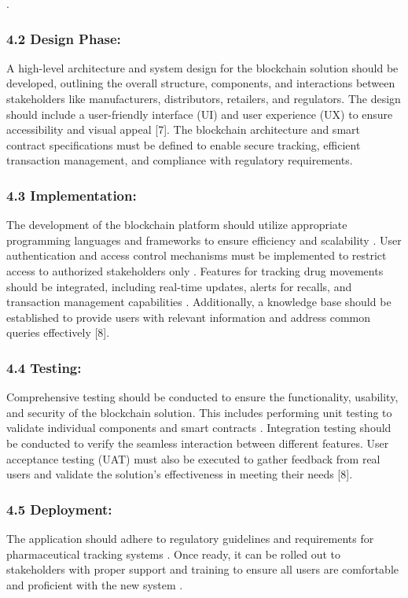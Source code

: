 \documentclass[runningheads]{llncs}
\begin{document}
.
\subsubsection{4.2 Design Phase:}
A high-level architecture and system design for the blockchain solution should be developed, outlining the overall structure, components, and interactions between stakeholders like manufacturers, distributors, retailers, and regulators. The design should include a user-friendly interface (UI) and user experience (UX) to ensure accessibility and visual appeal [7]. The blockchain architecture and smart contract specifications must be defined to enable secure tracking, efficient transaction management, and compliance with regulatory requirements.

\subsubsection{4.3 Implementation:}
The development of the blockchain platform should utilize appropriate programming languages and frameworks to ensure efficiency and scalability . User authentication and access control mechanisms must be implemented to restrict access to authorized stakeholders only . Features for tracking drug movements should be integrated, including real-time updates, alerts for recalls, and transaction management capabilities . Additionally, a knowledge base should be established to provide users with relevant information and address common queries effectively [8].

\subsubsection{4.4 Testing:}
Comprehensive testing should be conducted to ensure the functionality, usability, and security of the blockchain solution. This includes performing unit testing to validate individual components and smart contracts . Integration testing should be conducted to verify the seamless interaction between different features. User acceptance testing (UAT) must also be executed to gather feedback from real users and validate the solution’s effectiveness in meeting their needs [8].

\subsubsection{4.5 Deployment:}
The application should adhere to regulatory guidelines and requirements for pharmaceutical tracking systems . Once ready, it can be rolled out to stakeholders with proper support and training to ensure all users are comfortable and proficient with the new system .
\end{document}
